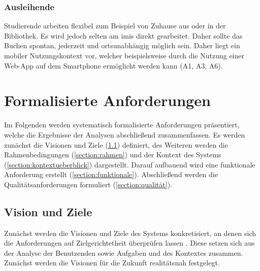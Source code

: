 \subsubsection{Ausleihende}
Studierende arbeiten flexibel zum Beispiel von Zuhause aus oder in der Bibliothek. Es wird jedoch
selten am \ac{imis} direkt gearbeitet. Daher sollte das Buchen spontan, jederzeit und ortsunabhängig
möglich sein. Daher liegt ein mobiler Nutzungskontext vor, welcher beispielsweise durch die Nutzung
einer Web-App auf dem Smartphone ermöglicht werden kann (A1, A3, A6).


\section{Formalisierte Anforderungen}
\label{section:anforderung}

Im Folgenden werden systematisch formalisierte Anforderungen präsentiert, welche die Ergebnisse der
Analysen abschließend zusammenfassen. Es werden zunächst die Visionen und Ziele
(\ref{section:visionziel}) definiert, des Weiteren werden die Rahmenbedingungen
(\ref{section:rahmen}) und der Kontext des Systems (\ref{section:kontextueberblick}) dargestellt.
Darauf aufbauend wird eine funktionale Anforderung erstellt (\ref{section:funktionale}).
Abschließend werden die Qualitätsanforderungen formuliert (\ref{section:qualität}).


\subsection{Vision und Ziele}
\label{section:visionziel}
Zunächst werden die Visionen und Ziele des Systems konkretisiert, an denen sich die Anforderungen
auf Zielgerichtetheit überprüfen lassen \cite{balzert2009}. Diese setzen sich aus der Analyse der
Benutzenden sowie Aufgaben und des Kontextes zusammen. Zunächst werden die Visionen für die Zukunft
realitätsnah festgelegt.

